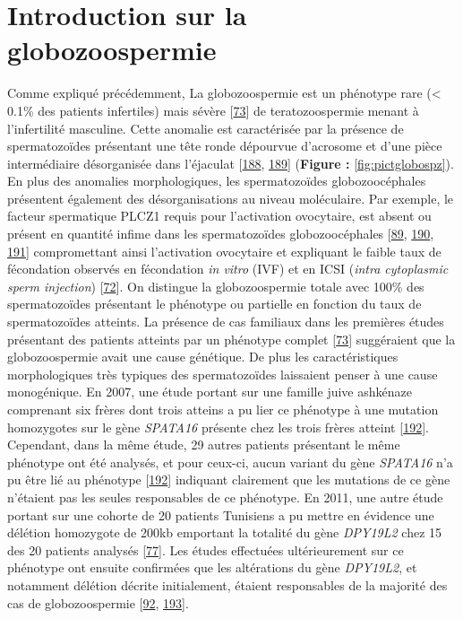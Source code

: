 \documentclass[12pt,a4paper,twoside]{ugathesis}
\theoremstyle{definition}
\theoremstyle{definition}
\theoremstyle{definition}
\theoremstyle{remark}
\begin{document}
\newpage 

\section{Introduction sur la
globozoospermie}\label{introduction-sur-la-globozoospermie}

Comme expliqué précédemment, La globozoospermie est un phénotype rare
(\textless{} 0.1\% des patients infertiles) mais sévère
{[}\protect\hyperlink{ref-Sen2009}{73}{]} de teratozoospermie menant à
l'infertilité masculine. Cette anomalie est caractérisée par la présence
de spermatozoïdes présentant une tête ronde dépourvue d'acrosome et
d'une pièce intermédiaire désorganisée dans l'éjaculat
{[}\protect\hyperlink{ref-Singh}{188},
\protect\hyperlink{ref-Pedersen1974}{189}{]} (\textbf{Figure :
}\ref{fig:pictglobospz}). En plus des anomalies morphologiques, les
spermatozoïdes globozoocéphales présentent également des
désorganisations au niveau moléculaire. Par exemple, le facteur
spermatique PLCZ1 requis pour l'activation ovocytaire, est absent ou
présent en quantité infime dans les spermatozoïdes globozoocéphales
{[}\protect\hyperlink{ref-Heytens2009}{89},
\protect\hyperlink{ref-Taylor2010}{190},
\protect\hyperlink{ref-Yoon2008}{191}{]} compromettant ainsi
l'activation ovocytaire et expliquant le faible taux de fécondation
observés en fécondation \emph{in vitro} (IVF) et en ICSI (\emph{intra
cytoplasmic sperm injection}) {[}\protect\hyperlink{ref-Dam2006}{72}{]}.
On distingue la globozoospermie totale avec 100\% des spermatozoïdes
présentant le phénotype ou partielle en fonction du taux de
spermatozoïdes atteints. La présence de cas familiaux dans les premières
études présentant des patients atteints par un phénotype complet
{[}\protect\hyperlink{ref-Sen2009}{73}{]} suggéraient que la
globozoospermie avait une cause génétique. De plus les caractéristiques
morphologiques très typiques des spermatozoïdes laissaient penser à une
cause monogénique. En 2007, une étude portant sur une famille juive
ashkénaze comprenant six frères dont trois atteins a pu lier ce
phénotype à une mutation homozygotes sur le gène \emph{SPATA16} présente
chez les trois frères atteint
{[}\protect\hyperlink{ref-Dam2007}{192}{]}. Cependant, dans la même
étude, 29 autres patients présentant le même phénotype ont été analysés,
et pour ceux-ci, aucun variant du gène \emph{SPATA16} n'a pu être lié au
phénotype {[}\protect\hyperlink{ref-Dam2007}{192}{]} indiquant
clairement que les mutations de ce gène n'étaient pas les seules
responsables de ce phénotype. En 2011, une autre étude portant sur une
cohorte de 20 patients Tunisiens a pu mettre en évidence une délétion
homozygote de 200kb emportant la totalité du gène \emph{DPY19L2} chez 15
des 20 patients analysés {[}\protect\hyperlink{ref-Harbuz2011}{77}{]}.
Les études effectuées ultérieurement sur ce phénotype ont ensuite
confirmées que les altérations du gène \emph{DPY19L2}, et notamment
délétion décrite initialement, étaient responsables de la majorité des
cas de globozoospermie {[}\protect\hyperlink{ref-ElInati2012}{92},
\protect\hyperlink{ref-Ray2011}{193}{]}.
\end{document}
